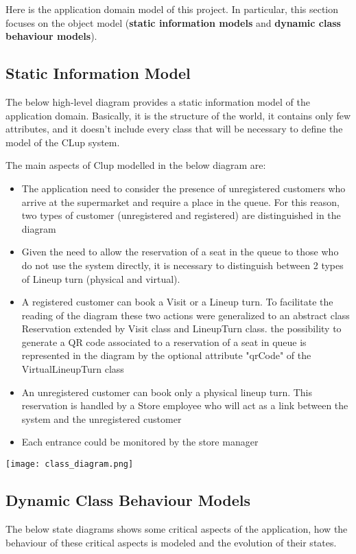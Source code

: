 Here is the application domain model of this project. In particular, this section focuses on the object model (\textbf{static information models} and \textbf{dynamic class behaviour models}).
\subsection{Static Information Model}
The below high-level diagram provides a static information model of the application domain. Basically, it is the structure of the world, it contains only few attributes, and it doesn't include every class that will be necessary to define the model of the CLup system. \newline

The main aspects of Clup modelled in the below diagram are:
\begin{itemize}
    \item The application need to consider the presence of unregistered customers who arrive at the supermarket and require a place in the queue. For this reason, two types of customer (unregistered and registered) are distinguished in the diagram
    \item Given the need to allow the reservation of a seat in the queue to those who do not use the system directly, it is necessary to distinguish between 2 types of Lineup turn (physical and virtual).
    \item A registered customer can book a Visit or a Lineup turn. To facilitate the reading of the diagram these two actions were generalized to an abstract class Reservation extended by Visit class and LineupTurn class. the possibility to generate a QR code associated to a reservation of a seat in queue is represented in the diagram by the optional attribute "qrCode" of the VirtualLineupTurn class
    \item An unregistered customer can book only a physical lineup turn. This reservation is handled by a Store employee who will act as a link between the system and the unregistered customer
    \item Each entrance could be monitored by the store manager
\end{itemize}
\texttt{[image: class\_diagram.png]}


\subsection{Dynamic Class Behaviour Models}
The below state diagrams shows some	critical aspects of	the	application, how the behaviour of these critical aspects is modeled and the evolution of their states. \newline

